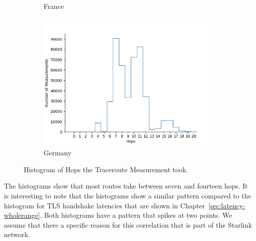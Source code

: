 \begin{figure}
\begin{subfigure}[b]{\linewidth}
		\caption{France}
	\end{subfigure}
	\begin{subfigure}[b]{\linewidth}
		\includegraphics[width=\linewidth]{chapters/4-results/traceroute/img/hops_DE.png}
		\caption{Germany}
	\end{subfigure}
	\caption{Histogram of Hops the Traceroute Measurement took.}
	\label{fig:hops-per-measument}
\end{figure}

The histograms show that most routes take between seven and fourteen hops.
It is interesting to note that the histograms show a similar pattern compared
to the histogram for TLS handshake latencies that are shown in
Chapter~\ref{sec:latency-wholerange}. Both histograms have a pattern that
spikes at two points. We assume that there a specific reason for this
correlation that is part of the Starlink network.




